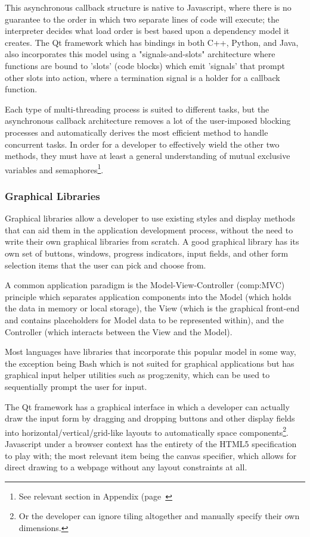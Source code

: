 This asynchronous callback structure is native to Javascript, where there is no guarantee to the order in which two separate lines of code will execute; the interpreter decides what load order is best based upon a dependency model it creates. The Qt framework which has bindings in both C++, Python, and Java, also incorporates this model using a "signals-and-slots" architecture where functions are bound to 'slots' (code blocks) which emit 'signals' that prompt other slots into action, where a termination signal is a holder for a callback function.

Each type of multi-threading process is suited to different tasks, but the asynchronous callback architecture removes a lot of the user-imposed blocking processes and automatically derives the most efficient method to handle concurrent tasks. In order for a developer to effectively wield the other two methods, they must have at least a general understanding of mutual exclusive variables and semaphores\footnote{See relevant section in Appendix (page~\pageref{ref:app:semaphores}}. 


\subsubsection{Graphical Libraries}

Graphical libraries allow a developer to use existing styles and display methods that can aid them in the application development process, without the need to write their own graphical libraries from scratch. A good graphical library has its own set of buttons, windows, progress indicators, input fields, and other form selection items that the user can pick and choose from.

A common application paradigm is the Model-View-Controller (\gls{comp:MVC}) principle which separates application components into the Model (which holds the data in memory or local storage), the View (which is the graphical front-end and contains placeholders for Model data to be represented within), and the Controller (which interacts between the View and the Model). 

Most languages have libraries that incorporate this popular model in some way, the exception being Bash which is not suited for graphical applications but has graphical input helper utilities such as \gls{prog:zenity}, which can be used to sequentially prompt the user for input.

The Qt framework has a graphical interface in which a developer can actually draw the input form by dragging and dropping buttons and other display fields into horizontal/vertical/grid-like layouts to automatically space components\footnote{Or the developer can ignore tiling altogether and manually specify their own dimensions.}. Javascript under a browser context has the entirety of the HTML5 specification to play with; the most relevant item being the canvas specifier, which allows for direct drawing to a webpage without any layout constraints at all\citep{html5}.

